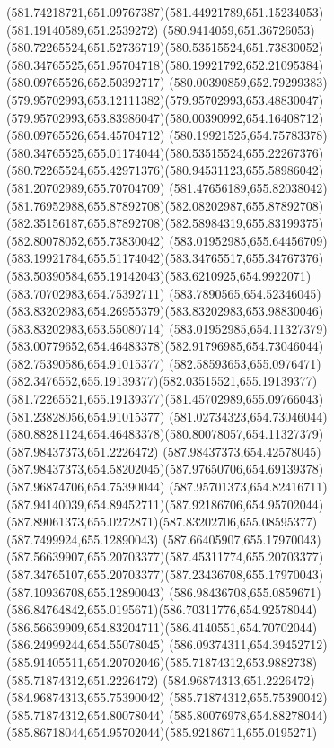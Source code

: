 {{	\curveto(581.74218721,651.09767387)(581.44921789,651.15234053)(581.19140589,651.2539272)
	\curveto(580.9414059,651.36726053)(580.72265524,651.52736719)(580.53515524,651.73830052)
	\curveto(580.34765525,651.95704718)(580.19921792,652.21095384)(580.09765526,652.50392717)
	\curveto(580.00390859,652.79299383)(579.95702993,653.12111382)(579.95702993,653.48830047)
	\curveto(579.95702993,653.83986047)(580.00390992,654.16408712)(580.09765526,654.45704712)
	\curveto(580.19921525,654.75783378)(580.34765525,655.01174044)(580.53515524,655.22267376)
	\curveto(580.72265524,655.42971376)(580.94531123,655.58986042)(581.20702989,655.70704709)
	\curveto(581.47656189,655.82038042)(581.76952988,655.87892708)(582.08202987,655.87892708)
	\curveto(582.35156187,655.87892708)(582.58984319,655.83199375)(582.80078052,655.73830042)
	\curveto(583.01952985,655.64456709)(583.19921784,655.51174042)(583.34765517,655.34767376)
	\curveto(583.50390584,655.19142043)(583.6210925,654.9922071)(583.70702983,654.75392711)
	\curveto(583.7890565,654.52346045)(583.83202983,654.26955379)(583.83202983,653.98830046)
	\lineto(583.83202983,653.55080714)
	\closepath
	\moveto(583.01952985,654.11327379)
	\curveto(583.00779652,654.46483378)(582.91796985,654.73046044)(582.75390586,654.91015377)
	\curveto(582.58593653,655.0976471)(582.3476552,655.19139377)(582.03515521,655.19139377)
	\curveto(581.72265521,655.19139377)(581.45702989,655.09766043)(581.23828056,654.91015377)
	\curveto(581.02734323,654.73046044)(580.88281124,654.46483378)(580.80078057,654.11327379)
	\closepath
	\moveto(587.98437373,651.2226472)
	\lineto(587.98437373,654.42578045)
	\curveto(587.98437373,654.58202045)(587.97650706,654.69139378)(587.96874706,654.75390044)
	\curveto(587.95701373,654.82416711)(587.94140039,654.89452711)(587.92186706,654.95702044)
	\curveto(587.89061373,655.0272871)(587.83202706,655.08595377)(587.7499924,655.12890043)
	\curveto(587.66405907,655.17970043)(587.56639907,655.20703377)(587.45311774,655.20703377)
	\curveto(587.34765107,655.20703377)(587.23436708,655.17970043)(587.10936708,655.12890043)
	\curveto(586.98436708,655.0859671)(586.84764842,655.0195671)(586.70311776,654.92578044)
	\curveto(586.56639909,654.83204711)(586.4140551,654.70702044)(586.24999244,654.55078045)
	\curveto(586.09374311,654.39452712)(585.91405511,654.20702046)(585.71874312,653.9882738)
	\lineto(585.71874312,651.2226472)
	\lineto(584.96874313,651.2226472)
	\lineto(584.96874313,655.75390042)
	\lineto(585.71874312,655.75390042)
	\lineto(585.71874312,654.80078044)
	\curveto(585.80076978,654.88278044)(585.86718044,654.95702044)(585.92186711,655.0195271)
}}
